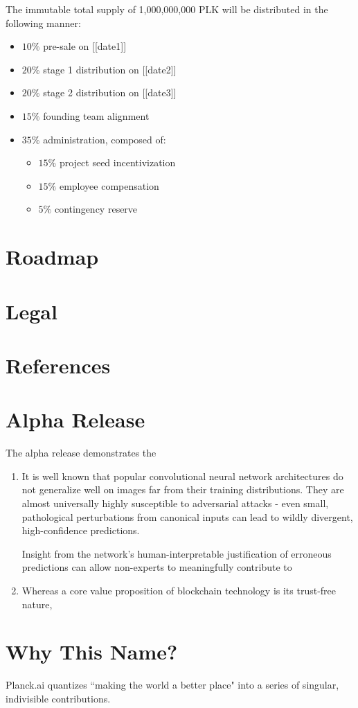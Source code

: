 \documentclass[12pt]{article}
\begin{document}
The immutable total supply of 1,000,000,000 PLK will be distributed in the following manner:
\begin{itemize}
\item{$10\%$ pre-sale on [[date1]]}
\item{$20\%$ stage 1 distribution on [[date2]]}
\item{$20\%$ stage 2 distribution on [[date3]]}
\item{$15\%$ founding team alignment}
\item{$35\%$ administration, composed of:}
\begin{itemize}
\item{$15\%$ project seed incentivization}
\item{$15\%$ employee compensation}
\item{$5\%$ contingency reserve}
\end{itemize}
\end{itemize}

\section{Roadmap}

\section{Legal}

\section{References}

\section{Alpha Release}
The alpha release demonstrates the 

\begin{enumerate}
\item{It is well known that popular convolutional neural network architectures do not generalize well on images far from their training distributions.  They are almost universally highly susceptible to adversarial attacks - even small, pathological perturbations from canonical inputs can lead to wildly divergent, high-confidence predictions.  

Insight from the network's human-interpretable justification of erroneous predictions can allow non-experts to meaningfully contribute to }
\item{Whereas a core value proposition of blockchain technology is its trust-free nature, }
\end{enumerate}

\section{Why This Name?}
Planck.ai quantizes ``making the world a better place" into a series of singular, indivisible contributions.
\end{document}
